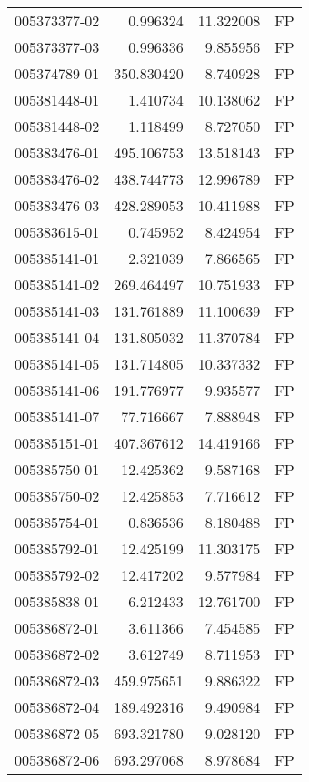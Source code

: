 \begin{tabular}{lrrl}
005373377-02 &    0.996324 &    11.322008 &   FP \\
005373377-03 &    0.996336 &     9.855956 &   FP \\
005374789-01 &  350.830420 &     8.740928 &   FP \\
005381448-01 &    1.410734 &    10.138062 &   FP \\
005381448-02 &    1.118499 &     8.727050 &   FP \\
005383476-01 &  495.106753 &    13.518143 &   FP \\
005383476-02 &  438.744773 &    12.996789 &   FP \\
005383476-03 &  428.289053 &    10.411988 &   FP \\
005383615-01 &    0.745952 &     8.424954 &   FP \\
005385141-01 &    2.321039 &     7.866565 &   FP \\
005385141-02 &  269.464497 &    10.751933 &   FP \\
005385141-03 &  131.761889 &    11.100639 &   FP \\
005385141-04 &  131.805032 &    11.370784 &   FP \\
005385141-05 &  131.714805 &    10.337332 &   FP \\
005385141-06 &  191.776977 &     9.935577 &   FP \\
005385141-07 &   77.716667 &     7.888948 &   FP \\
005385151-01 &  407.367612 &    14.419166 &   FP \\
005385750-01 &   12.425362 &     9.587168 &   FP \\
005385750-02 &   12.425853 &     7.716612 &   FP \\
005385754-01 &    0.836536 &     8.180488 &   FP \\
005385792-01 &   12.425199 &    11.303175 &   FP \\
005385792-02 &   12.417202 &     9.577984 &   FP \\
005385838-01 &    6.212433 &    12.761700 &   FP \\
005386872-01 &    3.611366 &     7.454585 &   FP \\
005386872-02 &    3.612749 &     8.711953 &   FP \\
005386872-03 &  459.975651 &     9.886322 &   FP \\
005386872-04 &  189.492316 &     9.490984 &   FP \\
005386872-05 &  693.321780 &     9.028120 &   FP \\
005386872-06 &  693.297068 &     8.978684 &   FP \\

\end{tabular}
